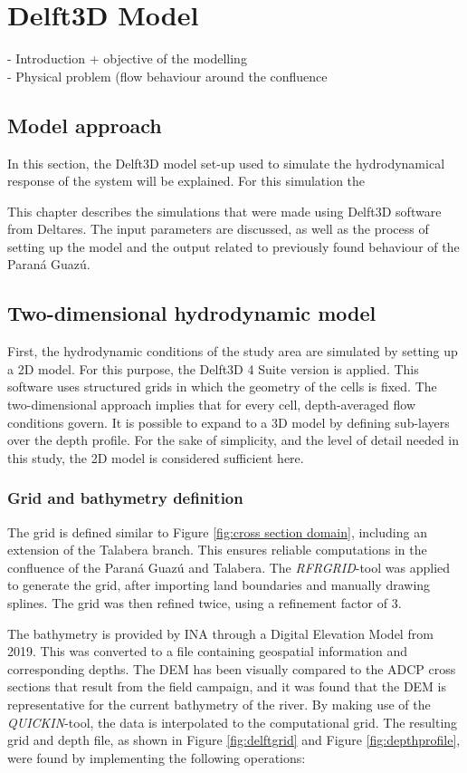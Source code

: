 \chapter{Delft3D Model}
\label{chap:Delft3DModel}
- Introduction + objective of the modelling \\
- Physical problem (flow behaviour around the confluence

\section{Model approach}
In this section, the Delft3D model set-up used to simulate the hydrodynamical response of the system will be explained. For this simulation the 




This chapter describes the simulations that were made using Delft3D software from Deltares. The input parameters are discussed, as well as the process of setting up the model and the output related to previously found behaviour of the Paraná Guazú. 

\section{Two-dimensional hydrodynamic model}
First, the hydrodynamic conditions of the study area are simulated by setting up a 2D model. For this purpose, the Delft3D 4 Suite version is applied. This software uses structured grids in which the geometry of the cells is fixed. The two-dimensional approach implies that for every cell, depth-averaged flow conditions govern. It is possible to expand to a 3D model by defining sub-layers over the depth profile. For the sake of simplicity, and the level of detail needed in this study, the 2D model is considered sufficient here. 

\subsection{Grid and bathymetry definition}
\label{section:bathemetry}
The grid is defined similar to Figure \ref{fig:cross section domain}, including an extension of the Talabera branch. This ensures reliable computations in the confluence of the Paraná Guazú and Talabera. The \textit{RFRGRID}-tool was applied to generate the grid, after importing land boundaries and manually drawing splines. The grid was then refined twice, using a refinement factor of 3. 

The bathymetry is provided by INA through a Digital Elevation Model from 2019. This was converted to a file containing geospatial information and corresponding depths. The DEM has been visually compared to the ADCP cross sections that result from the field campaign, and it was found that the DEM is representative for the current bathymetry of the river. By making use of the \textit{QUICKIN}-tool, the data is interpolated to the computational grid. The resulting grid and depth file, as shown in Figure \ref{fig:delftgrid} and Figure \ref{fig:depthprofile}, were found by implementing the following operations:

